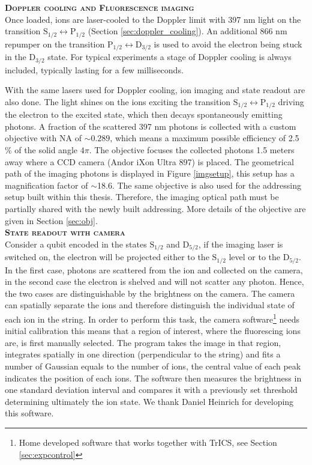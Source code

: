 \textbf{\textsc{Doppler cooling and Fluorescence imaging}}\\
Once loaded, ions are laser-cooled to the Doppler limit with 397 nm light on the transition $\text{S}_{1/2} \leftrightarrow \text{P}_{1/2}$ (Section \ref{sec:doppler_cooling}). An additional 866 nm repumper on the transition $\text{P}_{1/2} \leftrightarrow \text{D}_{3/2}$ is used to avoid the electron being stuck in the $\text{D}_{3/2}$ state. For typical experiments a stage of Doppler cooling is always included, typically lasting for a few milliseconds.\par
With the same lasers used for Doppler cooling, ion imaging and state readout are also done. The light shines on the ions exciting the transition $\text{S}_{1/2} \leftrightarrow \text{P}_{1/2}$ driving the electron to the excited state, which then decays spontaneously emitting photons. A fraction of the scattered 397 nm photons is collected with a custom objective with NA of $\sim 0.289$, which means a maximum possible efficiency of 2.5 \% of the solid angle $4\pi$. The objective focuses the collected photons 1.5 meters away where a CCD camera (Andor iXon Ultra 897) is placed. The geometrical path of the imaging photons is displayed in Figure \ref{imgsetup}, this setup has a magnification factor of $\sim$18.6. The same objective is also used for the addressing setup built within this thesis. Therefore, the imaging optical path must be partially shared with the newly built addressing. More details of the objective are given in Section \ref{sec:obj}.\vspace{.5em}\\
\textbf{\textsc{State readout with camera}}\\
Consider a qubit encoded in the states $\text{S}_{1/2}$ and $\text{D}_{5/2}$, if the imaging laser is switched on, the electron will be projected either to the $\text{S}_{1/2}$ level or to the $\text{D}_{5/2} $. In the first case, photons are scattered from the ion and collected on the camera, in the second case the electron is shelved and will not scatter any photon. Hence, the two cases are distinguishable by the brightness on the camera. The camera can spatially separate the ions and therefore distinguish the individual state of each ion in the string. In order to perform this task, the camera software\footnote{Home developed software that works together with TrICS, see Section \ref{sec:expcontrol}} needs initial calibration this means that a region of interest, where the fluorescing ions are, is first manually selected. The program takes the image in that region, integrates spatially in one direction (perpendicular to the string) and fits a number of Gaussian equals to the number of ions, the central value of each peak indicates the position of each ions. The software then measures the brightness in one standard deviation interval and compares it with a previously set threshold determining ultimately the ion state. We thank Daniel Heinrich for developing this software.

